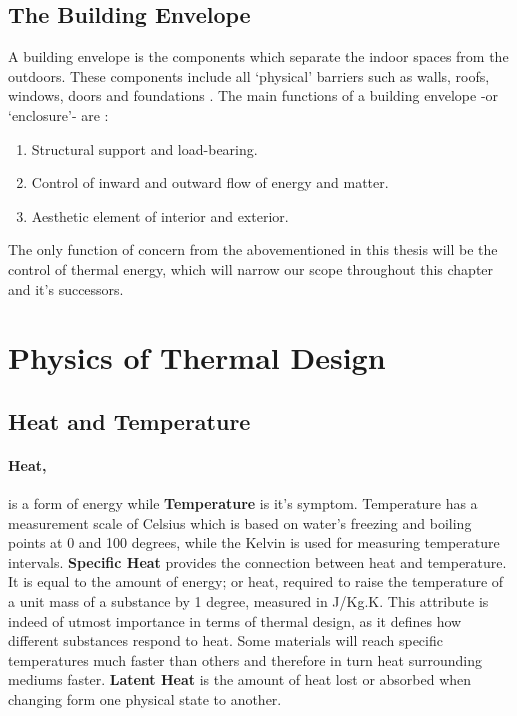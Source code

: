 \label{BuildEnvDef}
\subsection{The Building Envelope}
A building envelope is the components which separate the indoor spaces from the outdoors. These components include all `physical' barriers such as walls, roofs, windows, doors and foundations \cite{HPO}. The main functions of a building envelope -or `enclosure'- are \cite{straube05}:
\begin{enumerate}
  \item Structural support and load-bearing.
  \item Control of inward and outward flow of energy and matter.
  \item Aesthetic element of interior and exterior.
\end{enumerate}
The only function of concern from the abovementioned in this thesis will be the control of thermal energy, which will narrow our scope throughout this chapter and it's successors.

\section{Physics of Thermal Design}

\subsection{Heat and Temperature}
\paragraph{Heat,}is a form of energy while \textbf{Temperature} is it's symptom. Temperature has a measurement scale of Celsius which is based on water's freezing and boiling points at 0 and 100 degrees, while the Kelvin is used for measuring temperature intervals. \textbf{Specific Heat} provides the connection between heat and temperature. It is equal to the amount of energy; or heat, required to raise the temperature of a unit mass of a substance by 1 degree, measured in J/Kg.K. This attribute is indeed of utmost importance in terms of thermal design, as it defines how different substances respond to heat. Some materials will reach specific temperatures much faster than others and therefore in turn heat surrounding mediums faster. \textbf{Latent Heat} is the amount of heat lost or absorbed when changing form one physical state to another.

